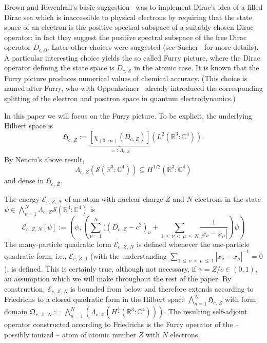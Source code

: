 \documentclass[AHL,Unicode,longabstracts,published]{cedram}
\newcommand*\cz{\mathbb{C}}
\newcommand*\rz{\mathbb{R}}
\newcommand*\cE{\mathcal{E}}
\newcommand*\cS{\mathcal{S}}
\newcommand*\gH{\mathfrak{H}}
\newcommand*\gQ{\mathfrak{Q}}
\begin{document}
Brown and Ravenhall's basic suggestion~\cite{BrownRavenhall1951} was to implement Dirac's idea \cite{Dirac1930A} of a filled Dirac sea which is inaccessible to physical electrons by requiring that the state space of an electron is the positive spectral subspace of a suitably chosen Dirac operator; in fact they suggest the positive spectral subspace of the free Dirac operator $D_{c,\,0}$. Later other choices were suggested (see Sucher~\cite{Sucher1980} for more details). A particular interesting choice yields the so called Furry picture, where the Dirac operator defining the state space is $D_{c,\,Z}$ in the atomic case. It is known that the Furry picture produces numerical values of chemical accuracy. (This choice is named after Furry, who with Oppenheimer~\cite{FurryOppenheimer1934} already introduced the corresponding splitting of the electron and positron space in quantum electrodynamics.)

In this paper we will focus on the Furry picture. To be explicit, the underlying Hilbert space is
\[
\gH_{c,\,Z}:=\underbrace{\left[\chi_{(0,\,\infty)}(D_{c,\,Z})\right]}_{=:\,\Lambda_{c,\,Z}}\left(L^2\left(\rz^3:\cz^4\right)\right).
\]
By Nenciu's above result,
\[
\Lambda_{c,\,Z}\left(\cS\left(\rz^3:\cz^4\right)\right)\subseteq H^{1/2}\left(\rz^3:\cz^4\right)
\]
and dense in $\gH_{c,\,Z}$.

The energy $\cE_{c,\,Z,\,N}$ of an atom with nuclear charge $Z$ and $N$ electrons in the state $\psi\in \bigwedge_{\nu=1}^N \Lambda_{c,\,Z}\cS(\rz^3:\cz^4)$ is
\begin{equation}\label{eq:manyfurry}
\cE_{c,\,Z,\,N}[\psi]:= \left(\psi,\left(\sum_{\nu=1}^N(\left(D_{c,\,Z}-c^2\right)_\nu+\sum_{1\,\leq\,\nu\,<\,\mu\,\leq\,N}\frac{1}{|x_\nu-x_\mu|}\right)\psi\right)
\end{equation}
The many-particle quadratic form $\cE_{c,\,Z,\,N}$ is defined whenever the one-particle quadratic form, i.e., $\cE_{c,\,Z,\,1}$ (with the understanding $\sum_{1\,\leq\,\nu\,<\,\mu\,\leq\,1}|x_\nu-x_\mu|^{-1}=0$), is defined. This is certainly true, although not necessary, if $\gamma=Z/c\in(0,1)$, an assumption which we will make throughout the rest of the paper. By construction, $\cE_{c,\,Z,\,N}$ is bounded from below and therefore extends according to Friedrichs to a closed quadratic form in the Hilbert space $\bigwedge_{n=1}^N \gH_{c,\,Z}$ with form domain $\gQ_{c,\,Z,\,N}:=\bigwedge_{n=1}^N(\Lambda_{c,\,Z}(H^{\frac12}(\rz^3:\cz^4)))$. The resulting self-adjoint operator constructed according to Friedrichs is the Furry operator of the -- possibly ionized -- atom of atomic number $Z$ with $N$ electrons.
\end{document}
